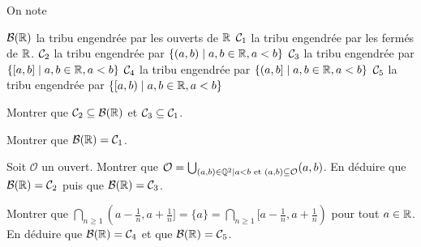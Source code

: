 \documentclass[french]{report}
\begin{document}
\begin{exo}
    On note\begin{enumerate}
        \itt \(\mathcal{B}(\mathbb{R})\) la tribu engendrée par les ouverts de \(\mathbb{R}\)
        \itt \(\mathcal{C}_1\) la tribu engendrée par les fermés de \(\mathbb{R}\).
        \itt \(\mathcal{C}_2\) la tribu engendrée par \(\{(a,b)\mid a,b\in\mathbb{R}, a<b\}\)
        \itt \(\mathcal{C}_3\) la tribu engendrée par \(\{[a,b]\mid a,b\in\mathbb{R}, a<b\}\)
        \itt \(\mathcal{C}_4\) la tribu engendrée par \(\{(a,b]\mid a,b\in\mathbb{R}, a<b\}\)
        \itt \(\mathcal{C}_5\) la tribu engendrée par \(\{[a,b)\mid a,b\in\mathbb{R}, a<b\}\)
    \end{enumerate}
    \begin{q}{1}
        Montrer que \(\mathcal{C}_2\subseteq \mathcal{B}(\mathbb{R})\) et \(\mathcal{C}_3\subseteq \mathcal{C}_1\).
    \end{q}
    \begin{q}{2}
        Montrer que \(\mathcal{B}(\mathbb{R})=\mathcal{C}_1\).
    \end{q}
    \begin{q}{3}
        Soit \(\mathcal{O}\) un ouvert. Montrer que \(\mathcal{O}=\bigcup_{(a,b)\in\mathbb{Q}^2
        \mid a<b\text{ et } (a,b)\subseteq\mathcal{O}} (a,b)\). En déduire que
        \(\mathcal{B}(\mathbb{R}) = \mathcal{C}_2\) puis que \(\mathcal{B}(\mathbb{R})=\mathcal{C}_3\).
    \end{q}
    \begin{q}{4}
        Montrer que \(\bigcap_{n\geq1}(a-\frac{1}{n},a+\frac{1}{n}]=\{a\}=
        \bigcap_{n\geq1}[a-\frac{1}{n},a+\frac{1}{n})\) pour tout \(a\in\mathbb{R}\). En
        déduire que \(\mathcal{B}(\mathbb{R})=\mathcal{C}_4\) et que \(\mathcal{B}(\mathbb{R})=\mathcal{C}_5\).
    \end{q}
\end{exo}
\end{document}
